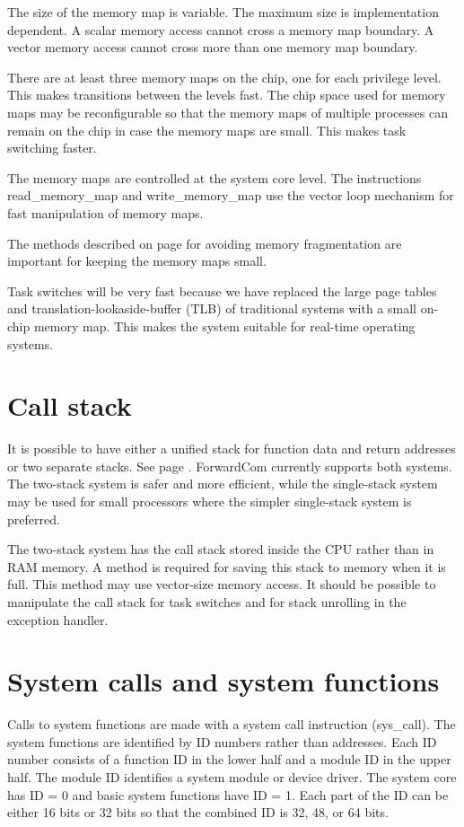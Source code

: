 \documentclass[forwardcom.tex]{subfiles}
\begin{document}
The size of the memory map is variable. The maximum size is implementation dependent.
A scalar memory access cannot cross a memory map boundary. A vector memory access cannot cross more than one memory map boundary.
\vspace{2mm}

There are at least three memory maps on the chip, one for each privilege level. This makes transitions between the levels fast. The chip space used for memory maps may be reconfigurable so that the memory maps of multiple processes can remain on the chip in case the memory maps are small. This makes task switching faster.
\vspace{2mm}

The memory maps are controlled at the system core level. The instructions read\_memory\_map and write\_memory\_map use the vector loop mechanism for fast manipulation of memory maps.
\vspace{2mm}

The methods described on page \pageref{memoryManagement} for avoiding memory fragmentation are important for keeping the memory maps small. 
\vspace{2mm}

Task switches will be very fast because we have replaced the large page tables and translation-lookaside-buffer (TLB) of traditional systems with a small on-chip memory map. This makes the system suitable for real-time operating systems.

\section{Call stack}
It is possible to have either a unified stack for function data and return addresses or two separate stacks. See page \pageref{callStackAlternatives}. ForwardCom currently supports both systems. The two-stack system is safer and more efficient, while the single-stack system may be used for small processors where the simpler single-stack system is preferred.
\vspace{2mm}

The two-stack system has the call stack stored inside the CPU rather than in RAM memory. A method is required for saving this stack to memory when it is full. This method may use vector-size memory access. It should be possible to manipulate the call stack for task switches and for stack unrolling in the exception handler.

\section{System calls and system functions} \label{systemCallIDSystem}
Calls to system functions are made with a system call instruction (sys\_call). The system functions are identified by ID numbers rather than addresses. Each ID number consists of a function ID in the lower half and a module ID in the upper half. The module ID identifies a system module or device driver. The system core has ID = 0 and basic system functions have ID = 1. Each part of the ID can be either 16 bits or 32 bits so that the combined ID is 32, 48, or 64 bits. 
\vspace{2mm}
\end{document}
